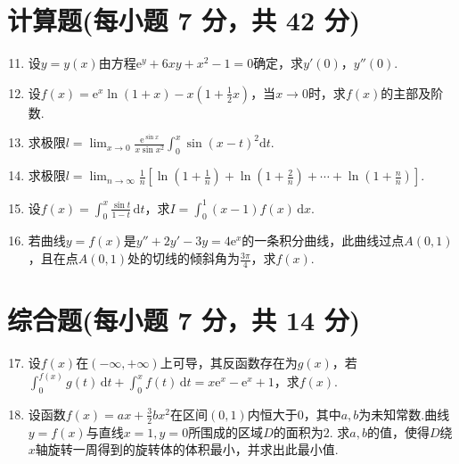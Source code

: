 \documentclass[../Main.tex]{subfiles}
\begin{document}
\section{计算题(每小题 7 分，共 42 分)}
\begin{enumerate}
    \setcounter{enumi}{10}
    \item 设$y=y(x)$由方程$\mathrm{e}^{y}+6xy+x^{2}-1=0$确定，求$y'(0)$，$y''(0)$.
          \vspace{12em}

    \item 设$f(x)=\mathrm{e}^{x}\ln(1+x)-x\left(1+\frac{1}{2}x\right)$，当$x
              \to0$时，求$f(x)$的主部及阶数.
          \vspace{11em}

    \item 求极限$l=\lim_{x\to0}\frac{\mathrm{e}^{\sin x}}{x\sin x^{2}}\int_{0}
              ^{x}\sin(x-t)^{2} \mathrm{d}t$.
          \vspace{11em}

    \item 求极限$l=\lim_{n\to\infty}\frac{1}{n}\left[\ln\left(1+\frac{1}{n}\right
                  )+\ln\left(1+\frac{2}{n}\right)+\cdots+\ln\left(1+\frac{n}{n}\right)\right]$.
          \vspace{11em}

    \item 设$f(x)=\int_{0}^{x}\frac{\sin t}{1-t}\,\mathrm{d}t$，求$I=\int_{0}^{1}
              (x-1)f(x)\,\mathrm{d}x$.
          \vspace{11em}

    \item 若曲线$y=f(x)$是$y''+2y'-3y=4\mathrm{e}^{x}$的一条积分曲线，此曲线过点$A
              (0,1)$，且在点$A(0,1)$处的切线的倾斜角为$\frac{3\pi}{4}$，求$f(x)$.
          \vspace{11em}
\end{enumerate}

\section{综合题(每小题 7 分，共 14 分)}
\begin{enumerate}
    \setcounter{enumi}{16}
    \item 设$f(x)$在$(-\infty,+\infty)$上可导，其反函数存在为$g(x)$，若$\int
              _{0}^{f(x)}g(t)\,\mathrm{d}t+\int_{0}^{x}f(t)\,\mathrm{d}t=x\mathrm{e}^{x}-\mathrm{e}
              ^{x}+1$，求$f(x)$.
          \vspace{12em}

    \item 设函数$f(x)=ax+\frac{3}{2}bx^{2}$在区间$(0,1)$内恒大于$0$，其中$a,
              b$为未知常数.曲线$y=f(x)$与直线$x=1,y=0$所围成的区域$D$的面积为$2$. 求$a,b$的值，使得$D$绕$x$轴旋转一周得到的旋转体的体积最小，并求出此最小值.
          \vspace{13em}
\end{enumerate}
\end{document}
